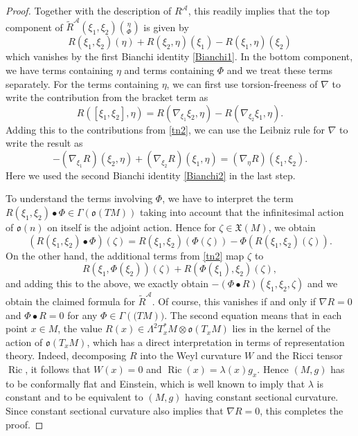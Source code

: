 \documentclass[10pt,a4paper]{amsart}
\def\Cal{\mathcal}
\newcommand{\Ga}{\Gamma}
\newcommand{\La}{\Lambda}
\newcommand{\Ph}{\Phi}
\newcommand{\Ric}{\operatorname{Ric}}
\def\frak{\mathfrak}
\newcommand{\la}{\lambda}
\begin{document}
\begin{proof}
  Together with the description of $R^{\Cal A}$, this readily implies that the top
  component of $\widetilde{R}^{\Cal A}(\xi_1,\xi_2)\binom{\eta}{\Phi}$ is given by
  $$
  R(\xi_1,\xi_2)(\eta)+R(\xi_2,\eta)(\xi_1)-R(\xi_1,\eta)(\xi_2)
  $$
  which vanishes by the first Bianchi identity \eqref{Bianchi1}. In the bottom
  component, we have terms containing $\eta$ and terms containing $\Ph$ and we treat
  these terms separately. For the terms containing $\eta$, we can first use
  torsion-freeness of $\nabla$ to write the contribution from the bracket term as
  $$
  R([\xi_1,\xi_2],\eta)=R(\nabla_{\xi_1}\xi_2,\eta)-R(\nabla_{\xi_2}\xi_1,\eta). 
  $$
  Adding this to the contributions from \eqref{tn2}, we can use the Leibniz rule for
  $\nabla$ to write the result as
  $$
  -(\nabla_{\xi_1}R)(\xi_2,\eta)+(\nabla_{\xi_2}R)(\xi_1,\eta)=(\nabla_\eta
  R)(\xi_1,\xi_2). 
  $$
  Here we used the second Bianchi identity \eqref{Bianchi2} in the last step.

  To understand the terms involving $\Phi$, we have to interpret the term
  $R(\xi_1,\xi_2)\bullet\Ph\in\Ga(\frak o(TM))$ taking into account that the
  infinitesimal action of $\frak o(n)$ on itself is the adjoint action. Hence for
  $\zeta\in\frak X(M)$, we obtain
  $$
(R(\xi_1,\xi_2)\bullet\Ph)(\zeta)=R(\xi_1,\xi_2)(\Phi(\zeta))-\Ph(R(\xi_1,\xi_2)(\zeta)). 
  $$
  On the other hand, the additional terms from \eqref{tn2} map $\zeta$ to
  $$
  R(\xi_1,\Ph(\xi_2))(\zeta)+R(\Phi(\xi_1),\xi_2)(\zeta), 
  $$ and adding this to the above, we exactly obtain $-(\Phi\bullet
  R)(\xi_1,\xi_2,\zeta)$ and we obtain the claimed formula for $\widetilde{R}^{\Cal
    A}$. Of course, this vanishes if and only if $\nabla R=0$ and $\Phi\bullet R=0$
  for any $\Phi\in\Ga(\frak (TM))$. The second equation means that in each point
  $x\in M$, the value $R(x)\in\La^2T^*_xM\otimes\frak o(T_xM)$ lies in the kernel of
  the action of $\frak o(T_xM)$, which has a direct interpretation in terms of
  representation theory. Indeed, decomposing $R$ into the Weyl curvature $W$ and the
  Ricci tensor $\Ric$, it follows that $W(x)=0$ and $\Ric(x)=\la(x)g_x$. Hence
  $(M,g)$ has to be conformally flat and Einstein, which is well known to imply that
  $\lambda$ is constant and to be equivalent to $(M,g)$ having constant sectional
  curvature. Since constant sectional curvature also implies that $\nabla R=0$, this
  completes the proof.
\end{proof}
\end{document}
